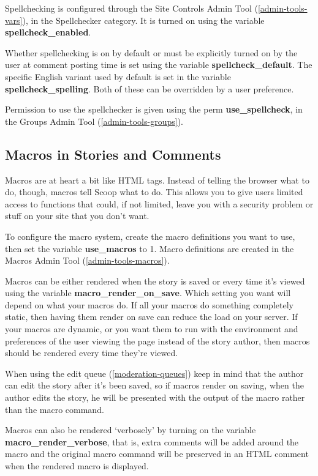 Spellchecking is configured through the Site Controls Admin Tool (\ref{admin-tools-vars}), in the Spellchecker category.  It is turned on using the variable {\bf spellcheck\_enabled}.

Whether spellchecking is on by default or must be explicitly turned on by the user at comment posting time is set using the variable {\bf spellcheck\_default}.  The specific English variant used by default is set in the variable {\bf spellcheck\_spelling}.  Both of these can be overridden by a user preference.

Permission to use the spellchecker is given using the perm {\bf use\_spellcheck}, in the Groups Admin Tool (\ref{admin-tools-groups}).

\subsection{Macros in Stories and Comments}
\label{features-macros}

Macros are at heart a bit like HTML tags. Instead of telling the browser what to do, though, macros tell Scoop what to do. This allows you to give users limited access to functions that could, if not limited, leave you with a security problem or stuff on your site that you don't want.

To configure the macro system, create the macro definitions you want to use, then set the variable {\bf use\_macros} to 1. Macro definitions are created in the Macros Admin Tool (\ref{admin-tools-macros}).

Macros can be either rendered when the story is saved or every time it's viewed using the variable {\bf macro\_render\_on\_save}. Which setting you want will depend on what your macros do. If all your macros do something completely static, then having them render on save can reduce the load on your server. If your macros are dynamic, or you want them to run with the environment and preferences of the user viewing the page instead of the story author, then macros should be rendered every time they're viewed.

When using the edit queue (\ref{moderation-queues}) keep in mind that the author can edit the story after it's been saved, so if macros render on saving, when the author edits the story, he will be presented with the output of the macro rather than the macro command.

Macros can also be rendered `verbosely' by turning on the variable {\bf macro\_render\_verbose}, that is, extra comments will be added around the macro and the original macro command will be preserved in an HTML comment when the rendered macro is displayed.

